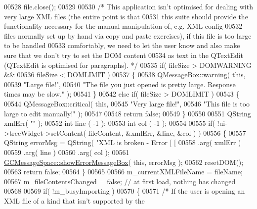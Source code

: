 \begin{DoxyCode}
{{00528   file.close();
00529 
00530   \textcolor{comment}{/* This application isn't optimised for dealing with very large XML files
       (the entire point is that}
00531 \textcolor{comment}{    this suite should provide the functionality necessary for the manual
       manipulation of, e.g. XML config}
00532 \textcolor{comment}{    files normally set up by hand via copy and paste exercises), if this file
       is too large to be handled}
00533 \textcolor{comment}{    comfortably, we need to let the user know and also make sure that we don't
       try to set the DOM content}
00534 \textcolor{comment}{    as text in the QTextEdit (QTextEdit is optimised for paragraphs). */}
00535   \textcolor{keywordflow}{if}( fileSize > DOMWARNING &&
00536       fileSize < DOMLIMIT )
00537   \{
00538     QMessageBox::warning( \textcolor{keyword}{this},
00539                           \textcolor{stringliteral}{"Large file!"},
00540                           \textcolor{stringliteral}{"The file you just opened is pretty large. Response
       times may be slow."} );
00541   \}
00542   \textcolor{keywordflow}{else} \textcolor{keywordflow}{if}( fileSize > DOMLIMIT )
00543   \{
00544     QMessageBox::critical( \textcolor{keyword}{this},
00545                            \textcolor{stringliteral}{"Very large file!"},
00546                            \textcolor{stringliteral}{"This file is too large to edit manually!"} );
00547 
00548     \textcolor{keywordflow}{return} \textcolor{keyword}{false};
00549   \}
00550 
00551   QString xmlErr( \textcolor{stringliteral}{""} );
00552   \textcolor{keywordtype}{int}     line  ( -1 );
00553   \textcolor{keywordtype}{int}     col   ( -1 );
00554 
00555   \textcolor{keywordflow}{if}( !ui->treeWidget->setContent( fileContent, &xmlErr, &line, &col ) )
00556   \{
00557     QString errorMsg = QString( \textcolor{stringliteral}{"XML is broken - Error [%
       [%
00558                        .arg( xmlErr )
00559                        .arg( line )
00560                        .arg( col );
00561     \hyperlink{namespace_g_c_message_space_ab118b3a133686167617eb955029fd44e}{GCMessageSpace::showErrorMessageBox}( \textcolor{keyword}{this}, errorMsg );
00562     resetDOM();
00563     \textcolor{keywordflow}{return} \textcolor{keyword}{false};
00564   \}
00565 
00566   m\_currentXMLFileName = fileName;
00567   m\_fileContentsChanged = \textcolor{keyword}{false};    \textcolor{comment}{// at first load, nothing has changed}
00568 
00569   \textcolor{keywordflow}{if}( !m\_busyImporting )
00570   \{
00571     \textcolor{comment}{/* If the user is opening an XML file of a kind that isn't supported by the
}}}}
\end{DoxyCode}
